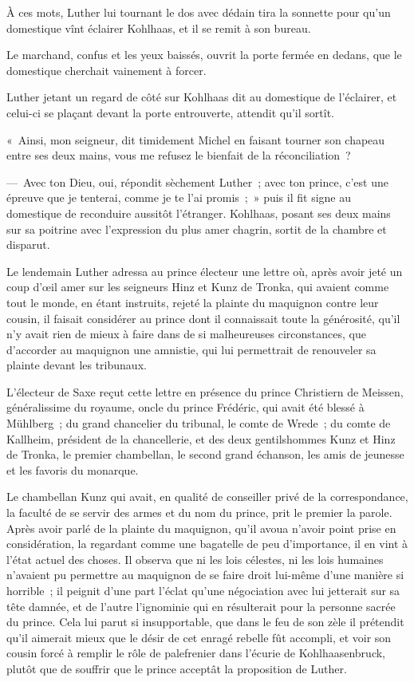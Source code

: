 \documentclass[french,twoside]{book} %
\begin{document}
À ces mots, Luther lui tournant le dos avec dédain tira la sonnette pour qu’un domestique vînt éclairer Kohlhaas, et il se remit à son bureau.\par
Le marchand, confus et les yeux baissés, ouvrit la porte fermée en dedans, que le domestique cherchait vainement à forcer.\par
Luther jetant un regard de côté sur Kohlhaas dit au domestique de l’éclairer, et celui-ci se plaçant devant la porte entrouverte, attendit qu’il sortît.\par
« Ainsi, mon seigneur, dit timidement Michel en faisant tourner son chapeau entre ses deux mains, vous me refusez le bienfait de la réconciliation ?\par
— Avec ton Dieu, oui, répondit sèchement Luther ; avec ton prince, c’est une épreuve que je tenterai, comme je te l’ai promis ; » puis il fit signe au domestique de reconduire aussitôt l’étranger. Kohlhaas, posant ses deux mains sur sa poitrine avec l’expression du plus amer chagrin, sortit de la chambre et disparut.\par
Le lendemain Luther adressa au prince électeur une lettre où, après avoir jeté un coup d’œil amer sur les seigneurs Hinz et Kunz de Tronka, qui avaient comme tout le monde, en étant instruits, rejeté la plainte du maquignon contre leur cousin, il faisait considérer au prince dont il connaissait toute la générosité, qu’il n’y avait rien de mieux à faire dans de si malheureuses circonstances, que d’accorder au maquignon une amnistie, qui lui permettrait de renouveler sa plainte devant les tribunaux.\par
L’électeur de Saxe reçut cette lettre en présence du prince Christiern de Meissen, généralissime du royaume, oncle du prince Frédéric, qui avait été blessé à Mühlberg ; du grand chancelier du tribunal, le comte de Wrede ; du comte de Kallheim, président de la chancellerie, et des deux gentilshommes Kunz et Hinz de Tronka, le premier chambellan, le second grand échanson, les amis de jeunesse et les favoris du monarque.\par
Le chambellan Kunz qui avait, en qualité de conseiller privé de la correspondance, la faculté de se servir des armes et du nom du prince, prit le premier la parole. Après avoir parlé de la plainte du maquignon, qu’il avoua n’avoir point prise en considération, la regardant comme une bagatelle de peu d’importance, il en vint à l’état actuel des choses. Il observa que ni les lois célestes, ni les lois humaines n’avaient pu permettre au maquignon de se faire droit lui-même d’une manière si horrible ; il peignit d’une part l’éclat qu’une négociation avec lui jetterait sur sa tête damnée, et de l’autre l’ignominie qui en résulterait pour la personne sacrée du prince. Cela lui parut si insupportable, que dans le feu de son zèle il prétendit qu’il aimerait mieux que le désir de cet enragé rebelle fût accompli, et voir son cousin forcé à remplir le rôle de palefrenier dans l’écurie de Kohlhaasenbruck, plutôt que de souffrir que le prince acceptât la proposition de Luther.\par
\end{document}

